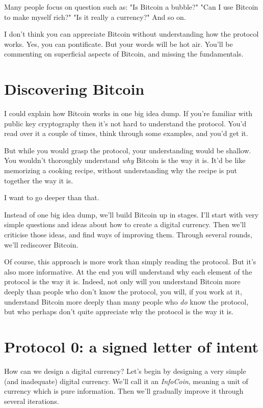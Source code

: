Many people focus on question such as: "Is Bitcoin a bubble?"  "Can I
use Bitcoin to make myself rich?"  "Is it really a currency?" And so
on.

I don't think you can appreciate Bitcoin without understanding how the
protocol works.  Yes, you can pontificate.  But your words will be hot
air.  You'll be commenting on superficial aspects of Bitcoin, and
missing the fundamentals.

\section{Discovering Bitcoin}

I could explain how Bitcoin works in one big idea dump.  If you're
familiar with public key cryptography then it's not hard to understand
the protocol.  You'd read over it a couple of times, think through
some examples, and you'd get it.

But while you would grasp the protocol, your understanding would be
shallow.  You wouldn't thoroughly understand \emph{why} Bitcoin is the
way it is.  It'd be like memorizing a cooking recipe, without
understanding why the recipe is put together the way it is.

I want to go deeper than that.

Instead of one big idea dump, we'll build Bitcoin up in stages.  I'll
start with very simple questions and ideas about how to create a
digital currency.  Then we'll criticise those ideas, and find ways of
improving them.  Through several rounds, we'll rediscover Bitcoin.

Of course, this approach is more work than simply reading the
protocol.  But it's also more informative.  At the end you will
understand why each element of the protocol is the way it is.  Indeed,
not only will you understand Bitcoin more deeply than people who don't
know the protocol, you will, if you work at it, understand Bitcoin
more deeply than many people who \emph{do} know the protocol, but who
perhaps don't quite appreciate why the protocol is the way it is.

\section{Protocol 0: a signed letter of intent}

How can we design a digital currency?  Let's begin by designing a very
simple (and inadequate) digital currency.  We'll call it an
\emph{InfoCoin}, meaning a unit of currency which is pure information.
Then we'll gradually improve it through several iterations.  

